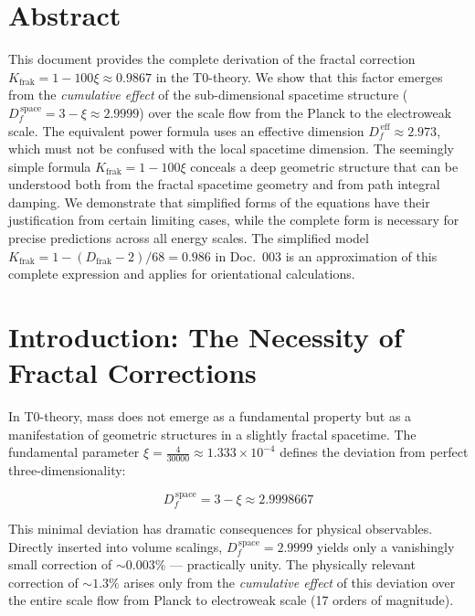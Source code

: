 \section*{Abstract}
		This document provides the complete derivation of the fractal correction $K_{\text{frak}} = 1 - 100\xi \approx 0.9867$ in the T0-theory. We show that this factor emerges from the \emph{cumulative effect} of the sub-dimensional spacetime structure ($D_f^{\,\text{space}} = 3 - \xi \approx 2.9999$) over the scale flow from the Planck to the electroweak scale. The equivalent power formula uses an effective dimension $D_f^{\,\text{eff}} \approx 2.973$, which must not be confused with the local spacetime dimension. The seemingly simple formula $K_{\text{frak}} = 1 - 100\xi$ conceals a deep geometric structure that can be understood both from the fractal spacetime geometry and from path integral damping. We demonstrate that simplified forms of the equations have their justification from certain limiting cases, while the complete form is necessary for precise predictions across all energy scales. The simplified model $K_{\text{frak}} = 1 - (D_{\text{frak}}-2)/68 = 0.986$ in Doc.~003 is an approximation of this complete expression and applies for orientational calculations.

	
	
	\section{Introduction: The Necessity of Fractal Corrections}
	
	In T0-theory, mass does not emerge as a fundamental property but as a manifestation of geometric structures in a slightly fractal spacetime. The fundamental parameter $\xi = \frac{4}{30000} \approx 1.333 \times 10^{-4}$ defines the deviation from perfect three-dimensionality:
	
	\begin{equation}
		D_f^{\,\text{space}} = 3 - \xi \approx 2.9998667
		\label{eq:Df_def}
	\end{equation}
	
	This minimal deviation has dramatic consequences for physical observables. Directly inserted into volume scalings, $D_f^{\,\text{space}} = 2.9999$ yields only a vanishingly small correction of $\sim 0.003\%$ --- practically unity. The physically relevant correction of $\sim 1.3\%$ arises only from the \emph{cumulative effect} of this deviation over the entire scale flow from Planck to electroweak scale (17 orders of magnitude).
	
